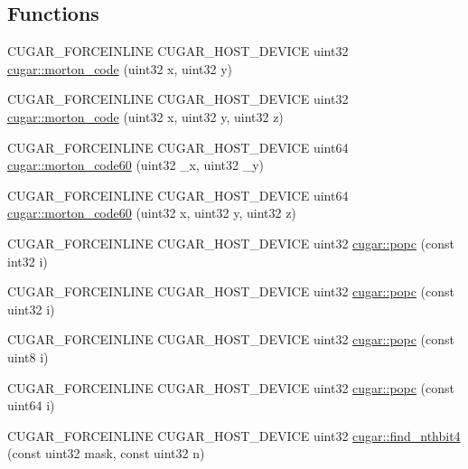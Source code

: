 \subsection*{Functions}
\begin{DoxyCompactItemize}
\item 
C\+U\+G\+A\+R\+\_\+\+F\+O\+R\+C\+E\+I\+N\+L\+I\+NE C\+U\+G\+A\+R\+\_\+\+H\+O\+S\+T\+\_\+\+D\+E\+V\+I\+CE uint32 \hyperlink{group___bits_module_ga6494ab687521f35e3e28dc1524d15218}{cugar\+::morton\+\_\+code} (uint32 x, uint32 y)
\item 
C\+U\+G\+A\+R\+\_\+\+F\+O\+R\+C\+E\+I\+N\+L\+I\+NE C\+U\+G\+A\+R\+\_\+\+H\+O\+S\+T\+\_\+\+D\+E\+V\+I\+CE uint32 \hyperlink{group___bits_module_ga4b9f4b0383537e421a0c7299ca64d76e}{cugar\+::morton\+\_\+code} (uint32 x, uint32 y, uint32 z)
\item 
C\+U\+G\+A\+R\+\_\+\+F\+O\+R\+C\+E\+I\+N\+L\+I\+NE C\+U\+G\+A\+R\+\_\+\+H\+O\+S\+T\+\_\+\+D\+E\+V\+I\+CE uint64 \hyperlink{group___bits_module_ga849b7e23fee1b2d3b573469a983cac3d}{cugar\+::morton\+\_\+code60} (uint32 \+\_\+x, uint32 \+\_\+y)
\item 
C\+U\+G\+A\+R\+\_\+\+F\+O\+R\+C\+E\+I\+N\+L\+I\+NE C\+U\+G\+A\+R\+\_\+\+H\+O\+S\+T\+\_\+\+D\+E\+V\+I\+CE uint64 \hyperlink{group___bits_module_ga341afe20927dde33979a1d6720d26569}{cugar\+::morton\+\_\+code60} (uint32 x, uint32 y, uint32 z)
\item 
C\+U\+G\+A\+R\+\_\+\+F\+O\+R\+C\+E\+I\+N\+L\+I\+NE C\+U\+G\+A\+R\+\_\+\+H\+O\+S\+T\+\_\+\+D\+E\+V\+I\+CE uint32 \hyperlink{group___bits_module_ga88a87094ba5547f8896d8947adfdec58}{cugar\+::popc} (const int32 i)
\item 
C\+U\+G\+A\+R\+\_\+\+F\+O\+R\+C\+E\+I\+N\+L\+I\+NE C\+U\+G\+A\+R\+\_\+\+H\+O\+S\+T\+\_\+\+D\+E\+V\+I\+CE uint32 \hyperlink{group___bits_module_gac8ac259ac805ab9499212e88829c6723}{cugar\+::popc} (const uint32 i)
\item 
C\+U\+G\+A\+R\+\_\+\+F\+O\+R\+C\+E\+I\+N\+L\+I\+NE C\+U\+G\+A\+R\+\_\+\+H\+O\+S\+T\+\_\+\+D\+E\+V\+I\+CE uint32 \hyperlink{group___bits_module_ga073933cb13ac2d78195d52f59b3460a7}{cugar\+::popc} (const uint8 i)
\item 
C\+U\+G\+A\+R\+\_\+\+F\+O\+R\+C\+E\+I\+N\+L\+I\+NE C\+U\+G\+A\+R\+\_\+\+H\+O\+S\+T\+\_\+\+D\+E\+V\+I\+CE uint32 \hyperlink{group___bits_module_ga64c0867f55f331496bc7617303b9e650}{cugar\+::popc} (const uint64 i)
\item 
C\+U\+G\+A\+R\+\_\+\+F\+O\+R\+C\+E\+I\+N\+L\+I\+NE C\+U\+G\+A\+R\+\_\+\+H\+O\+S\+T\+\_\+\+D\+E\+V\+I\+CE uint32 \hyperlink{group___bits_module_ga7f02d582847e11ea8454216ad36dc77b}{cugar\+::find\+\_\+nthbit4} (const uint32 mask, const uint32 n)

\end{DoxyCompactItemize}
